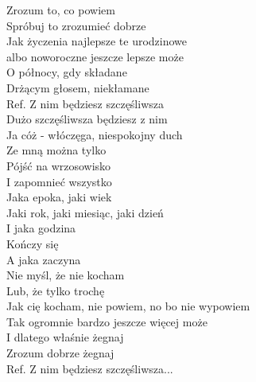 
\begin{flushleft}
Zrozum to, co powiem  \tab{} \\
Spróbuj to zrozumieć dobrze  \tab{}\\
Jak życzenia najlepsze te urodzinowe  \\
albo noworoczne jeszcze lepsze może  \\
O północy, gdy składane \tab{} \\
Drżącym głosem, niekłamane \tab{} \\
\vskip 3mm
Ref. Z nim będziesz szczęśliwsza \\
\hspace{0.9cm}Dużo szczęśliwsza będziesz z nim \\
\hspace{0.9cm}Ja cóż - włóczęga, niespokojny duch  \\
\hspace{0.9cm}Ze mną można tylko  \tab{}\\
\hspace{0.9cm}Pójść na wrzosowisko  \tab{}\\
\hspace{0.9cm}I zapomnieć wszystko  \tab{}\\
\hspace{1.8cm}Jaka epoka, jaki wiek \\
\hspace{1.8cm}Jaki rok, jaki miesiąc, jaki dzień  \\
\hspace{1.8cm}I jaka godzina  \tab{}\\
\hspace{1.8cm}Kończy się \tab{} \\
\hspace{1.8cm}A jaka zaczyna \tab{} \\
\vskip 3mm
Nie myśl, że nie kocham \\
Lub, że tylko trochę \\
Jak cię kocham, nie powiem, no bo nie wypowiem \\
Tak ogromnie bardzo jeszcze więcej może \\
I dlatego właśnie żegnaj \\
Zrozum dobrze żegnaj \\
\vskip 3mm
Ref. Z nim będziesz szczęśliwsza...\\

\end{flushleft}
